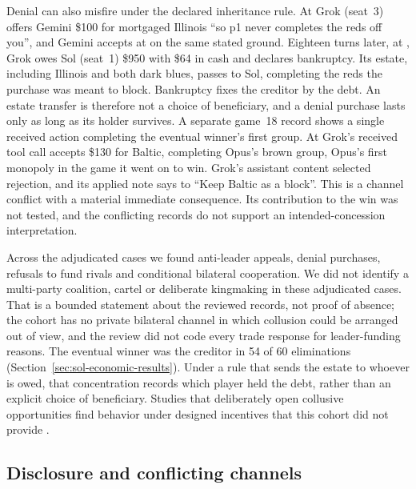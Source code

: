 Denial can also misfire under the declared inheritance rule. At  Grok (seat~3) offers Gemini \$100 for mortgaged Illinois ``so p1 never completes the reds off you'', and Gemini accepts at  on the same stated ground. Eighteen turns later, at , Grok owes Sol (seat~1) \$950 with \$64 in cash and declares bankruptcy. Its estate, including Illinois and both dark blues, passes to Sol, completing the reds the purchase was meant to block. Bankruptcy fixes the creditor by the debt. An estate transfer is therefore not a choice of beneficiary, and a denial purchase lasts only as long as its holder survives. A separate game~18 record shows a single received action completing the eventual winner's first group. At  Grok's received tool call accepts \$130 for Baltic, completing Opus's brown group, Opus's first monopoly in the game it went on to win. Grok's assistant content selected rejection, and its applied note says to ``Keep Baltic as a block''. This is a channel conflict with a material immediate consequence. Its contribution to the win was not tested, and the conflicting records do not support an intended-concession interpretation.

Across the adjudicated cases we found anti-leader appeals, denial purchases, refusals to fund rivals and conditional bilateral cooperation. We did not identify a multi-party coalition, cartel or deliberate kingmaking in these adjudicated cases. That is a bounded statement about the reviewed records, not proof of absence; the cohort has no private bilateral channel in which collusion could be arranged out of view, and the review did not code every trade response for leader-funding reasons. The eventual winner was the creditor in 54 of 60 eliminations (Section~\ref{sec:sol-economic-results}). Under a rule that sends the estate to whoever is owed, that concentration records which player held the debt, rather than an explicit choice of beneficiary. Studies that deliberately open collusive opportunities find behavior under designed incentives that this cohort did not provide \citep{shi2026emergentcollusion}.

\subsection{Disclosure and conflicting channels}\label{sec:conduct-channels}

